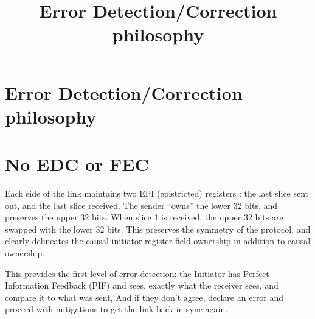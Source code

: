 

\title{Error Detection/Correction philosophy}


%

%


\section{Error Detection/Correction philosophy}


\section{No EDC or FEC}

Each side of the link maintains two EPI (epistricted) registers : the last slice sent out, and the last slice received. The sender “owns” the lower 32 bits, and preserves the upper 32 bits. When slice 1 is received, the upper 32 bits are swapped with the lower 32 bits.  This preserves the symmetry of the protocol, and clearly delineates the causal initiator register field ownership in addition to causal ownership.

This provides the first level of error detection: the Initiator has Perfect Information Feedback (PIF) and  sees. exactly what the receiver sees, and compare it to what was sent, And if they don’t agree, declare an error and proceed with mitigations to get the link back in sync again.


